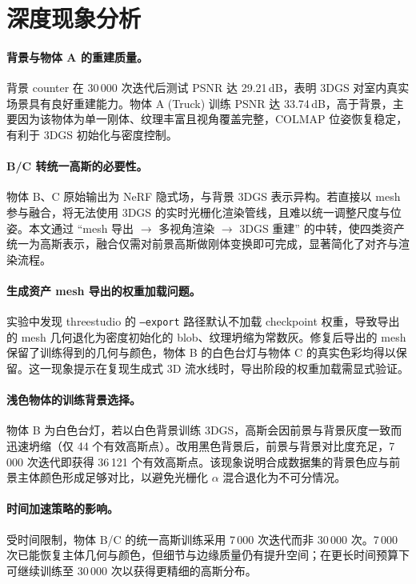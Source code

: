 \documentclass{article}
\begin{document}
\section{深度现象分析}

\paragraph{背景与物体 A 的重建质量。}
背景 counter 在 30\,000 次迭代后测试 PSNR 达 29.21\,dB，表明 3DGS 对室内真实场景具有良好重建能力。物体 A (Truck) 训练 PSNR 达 33.74\,dB，高于背景，主要因为该物体为单一刚体、纹理丰富且视角覆盖完整，COLMAP 位姿恢复稳定，有利于 3DGS 初始化与密度控制。

\paragraph{B/C 转统一高斯的必要性。}
物体 B、C 原始输出为 NeRF 隐式场，与背景 3DGS 表示异构。若直接以 mesh 参与融合，将无法使用 3DGS 的实时光栅化渲染管线，且难以统一调整尺度与位姿。本文通过 ``mesh 导出 $\rightarrow$ 多视角渲染 $\rightarrow$ 3DGS 重建'' 的中转，使四类资产统一为高斯表示，融合仅需对前景高斯做刚体变换即可完成，显著简化了对齐与渲染流程。

\paragraph{生成资产 mesh 导出的权重加载问题。}
实验中发现 threestudio 的 \texttt{--export} 路径默认不加载 checkpoint 权重，导致导出的 mesh 几何退化为密度初始化的 blob、纹理坍缩为常数灰。修复后导出的 mesh 保留了训练得到的几何与颜色，物体 B 的白色台灯与物体 C 的真实色彩均得以保留。这一现象提示在复现生成式 3D 流水线时，导出阶段的权重加载需显式验证。

\paragraph{浅色物体的训练背景选择。}
物体 B 为白色台灯，若以白色背景训练 3DGS，高斯会因前景与背景灰度一致而迅速坍缩（仅 44 个有效高斯点）。改用黑色背景后，前景与背景对比度充足，7\,000 次迭代即获得 36\,121 个有效高斯点。该现象说明合成数据集的背景色应与前景主体颜色形成足够对比，以避免光栅化 $\alpha$ 混合退化为不可分情况。

\paragraph{时间加速策略的影响。}
受时间限制，物体 B/C 的统一高斯训练采用 7\,000 次迭代而非 30\,000 次。7\,000 次已能恢复主体几何与颜色，但细节与边缘质量仍有提升空间；在更长时间预算下可继续训练至 30\,000 次以获得更精细的高斯分布。
\end{document}
